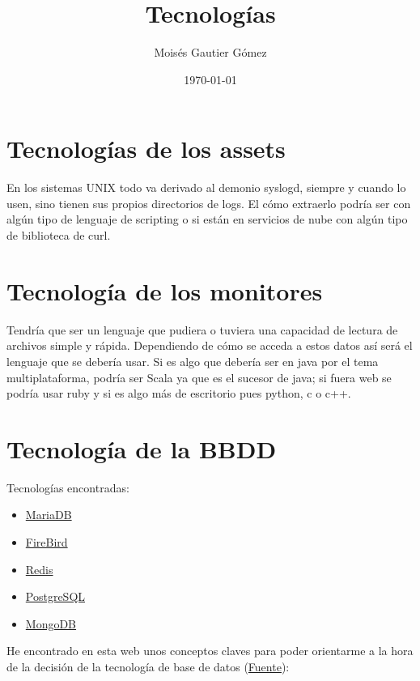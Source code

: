 \documentclass[a4paper,12pt]{article}
\author{Moisés Gautier Gómez}
\title{Tecnologías}
\date{\today}
\begin{document}
\maketitle

\section{Tecnologías de los assets}

En los sistemas UNIX todo va derivado al demonio syslogd, siempre y cuando lo usen, sino tienen sus propios directorios de logs. El cómo extraerlo podría ser con algún tipo de lenguaje de scripting o si están en servicios de nube con algún tipo de biblioteca de curl.

\section{Tecnología de los monitores}

Tendría que ser un lenguaje que pudiera o tuviera una capacidad de lectura de archivos simple y rápida. Dependiendo de cómo se acceda a estos datos así será el lenguaje que se debería usar. Si es algo que debería ser en java por el tema multiplataforma, podría ser Scala ya que es el sucesor de java; si fuera web se podría usar ruby y si es algo más de escritorio pues python, c o c++.

\section{Tecnología de la BBDD}

Tecnologías encontradas:
\begin{itemize}
\item \href{https://mariadb.com/}{MariaDB}
\item \href{http://www.firebirdsql.org/}{FireBird}
\item \href{http://redis.io/}{Redis}
\item \href{http://www.postgresql.org.es/}{PostgreSQL}
\item \href{https://www.mongodb.org/}{MongoDB}
\end{itemize}

He encontrado en esta web unos conceptos claves para poder orientarme a la hora de la decisión de la tecnología de base de datos (\href{http://www.postgresql.org.es/primeros\_pasos}{Fuente}):
\end{document}
